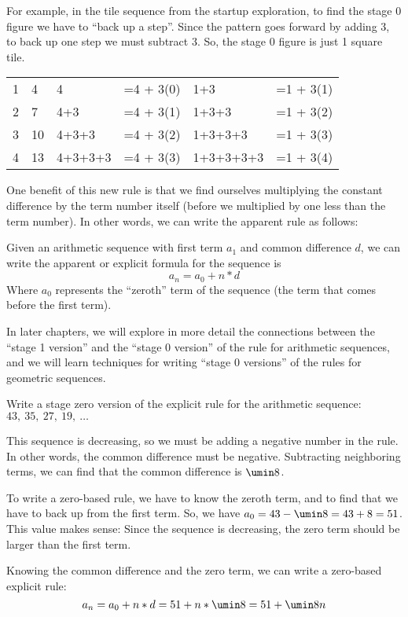 For example, in the tile sequence from the startup exploration, to find the stage 0 figure we have to ``back up a step''. Since the pattern goes forward by adding 3, to back up one step we must subtract 3. So, the stage 0 figure is just 1 square tile.

\begin{center}\begin{tabular}{C{1cm}C{1cm}|L{3cm}L{2cm}|L{3cm}L{2cm}}
& &  &&  &
\\ & 4
& 4 & =4 + 3(0)
& 1+3 & =1 + 3(1)
\\
2 & 7
& 4+3 & =4 + 3(1)
& 1+3+3 & =1 + 3(2)
\\
3 & 10
& 4+3+3 & =4 + 3(2)
& 1+3+3+3 & =1 + 3(3)
\\
4 & 13
& 4+3+3+3 & =4 + 3(3)
& 1+3+3+3+3 & =1 + 3(4)
\\
\end{tabular}\end{center}

One benefit of this new rule is that we find ourselves multiplying the constant difference by the term number itself (before we multiplied by one less than the term number). In other words, we can write the apparent rule as follows:

\begin{boxeddef}
Given an arithmetic sequence with first term $a_1$ and common difference $d$, we can write the apparent or explicit formula for the sequence is \[a_n = a_0 + n \ast d\] Where $a_0$ represents the ``zeroth'' term of the sequence (the term that comes before the first term).
\end{boxeddef}

In later chapters, we will explore in more detail the connections between the ``stage 1 version'' and the ``stage 0 version'' of the rule for arithmetic sequences, and we will learn techniques for writing ``stage 0 versions'' of the rules for geometric sequences.

\begin{boxedex}
Write a stage zero version of the explicit rule for the arithmetic sequence: $43,~ 35,~ 27,~ 19,~ \dotsc$

\exsoln{} This sequence is decreasing, so we must be adding a negative number in the rule. In other words, the common difference must be negative. Subtracting neighboring terms, we can find that the common difference is $\umin8$.

To write a zero-based rule, we have to know the zeroth term, and to find that we have to back up from the first term. So, we have $a_0 = 43 - \umin8 = 43 + 8 = 51$. This value makes sense: Since the sequence is decreasing, the zero term should be larger than the first term.

Knowing the common difference and the zero term, we can write a zero-based explicit rule: \[a_n = a_0 + n \ast d = 51 + n \ast \umin8 = 51 + \umin8n\]
\end{boxedex}

